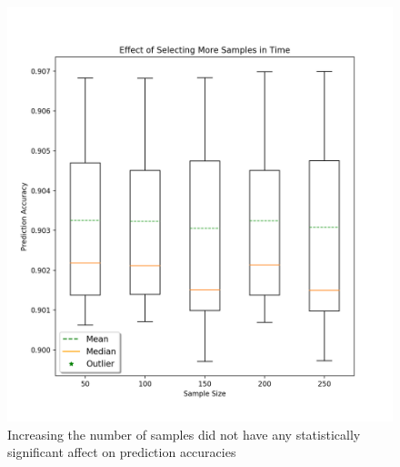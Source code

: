 \begin{figure}
	\centering
	\includegraphics[width=\columnwidth]{time_analysis.png}
	\caption{Increasing the number of samples did not have any statistically significant affect on prediction accuracies}
    \label{fig:umn_analysis}
\end{figure}

